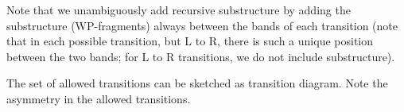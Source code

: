 \documentclass[11pt]{article} %
\newcommand{\PKnone}{P\!K}
\newcommand{\constrIO} {_\text{O}}
\newcommand{\constrIL} {_\text{L}}
\newcommand{\constrIIO}{_\text{O}}
\newcommand{\constrIIR}{_\text{R}}
\begin{document}
Note that we unambiguously add recursive substructure by adding the substructure (WP-fragments) always between the bands of each transition (note that in each possible transition, but L to R, there is such a unique position between the two bands; for L to R transitions, we do not include substructure).

The set of allowed transitions can be sketched as transition diagram.
Note the asymmetry in the allowed transitions.

%
%
%
%
%
%
%
%
%
%
%
\end{document}
